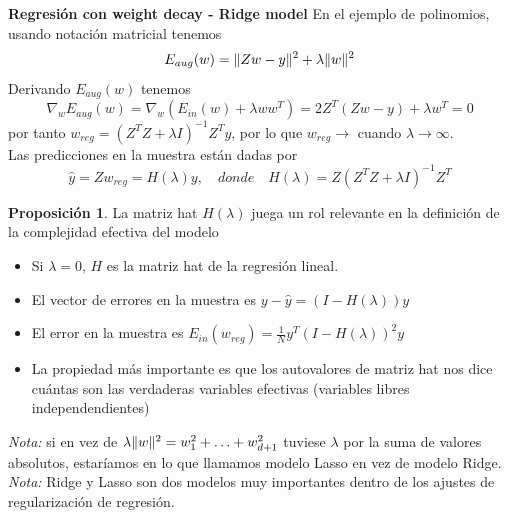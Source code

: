 \documentclass[11pt,a4paper]{article}
\DeclarePairedDelimiter{\norm}{\lVert}{\rVert}
\theoremstyle{definition}
\newtheorem{proposition}{Proposición}[section]
\begin{document}
	\textbf{Regresión con weight decay - Ridge model}
	En el ejemplo de polinomios, usando notación matricial tenemos
	$$E_{aug}(w)=\norm{Zw-y}^2+\lambda \norm{w}^2$$
	Derivando $E_{aug}(w)$ tenemos
	$$\nabla_w E_{aug}(w)=\nabla_w (E_{in}(w)+\lambda ww^T)=2Z^T(Zw-y)+\lambda w^T=0$$
	por tanto $w_{reg}=(Z^TZ+\lambda I)^{-1}Z^Ty$, por lo que $w_{reg}\to$ cuando $\lambda \to \infty$.\\
	Las predicciones en la muestra están dadas por $$\hat y=Zw_{reg}=H(\lambda)y, \quad{ donde } \quad H(\lambda)=Z(Z^TZ+\lambda I)^{-1}Z^T$$
	\begin{proposition}
	La matriz hat $H(\lambda)$ juega un rol relevante en la definición de la complejidad efectiva del modelo
	\begin{itemize}
		\item Si $\lambda=0$, $H$ es la matriz hat de la regresión lineal.
		\item El vector de errores en la muestra es $y-\hat y=(I-H(\lambda))y$
		\item El error en la muestra es $E_{in}(w_{reg})=\frac{1}{N}y^T(I-H(\lambda))^2y$
		\item La propiedad más importante es que los autovalores de matriz hat nos dice cuántas son las verdaderas variables efectivas (variables libres independendientes)
	\end{itemize}
	\end{proposition}
	
	\textit{Nota:} si en vez de $\lambda \norm{w}^2=w_1^2+\ldots +w_{d+1}^2$ tuviese $\lambda$ por la suma de valores absolutos, estaríamos en lo que llamamos modelo Lasso en vez de modelo Ridge. \\
	\textit{Nota:} Ridge y Lasso son dos modelos muy importantes dentro de los ajustes de regularización de regresión.
	
\end{document}
